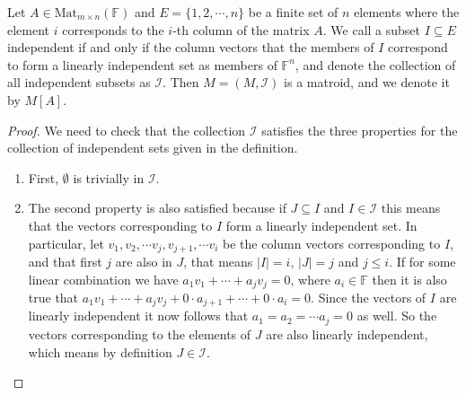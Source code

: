 \begin{theorem}

    Let $A \in \mathrm{Mat} _{m \times n}(\mathbb{F})$ and $E = \{1, 2, \cdots, n\}$ be a finite set of $n$ elements where the element $i$ corresponds to the $i$-th column of the matrix $A$. We call a subset $I \subseteq E$ independent if and only if the column vectors that the members of $I$ correspond to form a linearly independent set as members of $\mathbb{F}^n$, and denote the collection of all independent subsets as $\mathcal{I}$. Then $M = (M, \mathcal{I})$ is a matroid, and we denote it by $M[A]$.
    
\end{theorem}

\begin{proof}
    We need to check that the collection $\mathcal{I}$ satisfies the three properties for the collection of independent sets given in the definition. 

\begin{enumerate}

    \item First, $\emptyset$ is trivially in $\mathcal{I}$.
    
    \item The second property is also satisfied because if $J \subseteq I$ and $I \in \mathcal{I}$ this means that the vectors corresponding to $I$ form a linearly independent set. In particular, let $v_1, v_2, \cdots v_j, v_{j+1}, \cdots v_{i}$ be the column vectors corresponding to $I$, and that first $j$ are also in $J$, that means $|I| = i$, $|J| = j$ and $j \leq i$. If for some linear combination we have $a_1v_1 + \cdots + a_jv_j = 0$, where $a_i \in \mathbb{F}$ then it is also true that $a_1v_1 + \cdots + a_jv_j + 0 \cdot a_{j+1} + \cdots + 0 \cdot a_i = 0$. Since the vectors of $I$ are linearly independent it now follows that $a_1 = a_2 = \cdots a_j = 0$ as well. So the vectors corresponding to the elements of $J$ are also linearly independent, which means by definition $J \in \mathcal{I}$.


\end{enumerate}
\end{proof}

